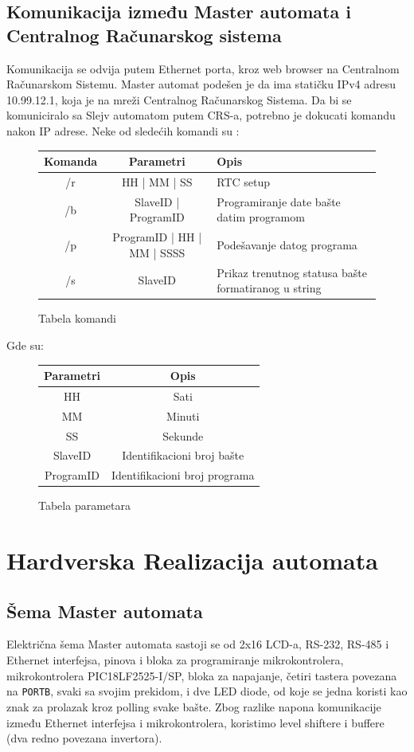 \documentclass[12pt]{article}
\numberwithin{figure}{section}
\begin{document}
  \subsection{Komunikacija između Master automata i Centralnog Računarskog sistema}
    Komunikacija se odvija putem Ethernet porta, kroz web browser na Centralnom Računarskom Sistemu. 
    Master automat podešen je da ima statičku IPv4 adresu 10.99.12.1, koja je na mreži Centralnog Računarskog Sistema.
    Da bi se komuniciralo sa Slejv automatom putem CRS-a, potrebno je dokucati komandu nakon IP adrese.
    Neke od sledećih komandi su :
    \begin{figure}[ht]
      \begin{tabular}{|c|c|p{7cm}|}
        \hline
        Komanda & Parametri & Opis \\
        \hline
        /r & HH | MM | SS & RTC setup \\
        \hline
        /b & SlaveID | ProgramID & Programiranje date bašte datim programom \\
        \hline
        /p & ProgramID | HH | MM | SSSS & Podešavanje datog programa \\
        \hline
        /s & SlaveID & Prikaz trenutnog statusa bašte formatiranog u string \\
        \hline
      \end{tabular}
      \caption{Tabela komandi}
    \end{figure}
    Gde su: 
   \begin{figure}[ht]
     \centering
      \begin{tabular}{|c|c|}
        \hline
        Parametri & Opis \\
        \hline
        HH & Sati \\ 
        MM & Minuti \\ 
        SS & Sekunde \\
        \hline
        SlaveID & Identifikacioni broj bašte \\
        ProgramID & Identifikacioni broj programa \\
        \hline
      \end{tabular}
      \caption{Tabela parametara}
    \end{figure}
\clearpage
\section{Hardverska Realizacija automata}
  \subsection{Šema Master automata}
  Električna šema Master automata sastoji se od 2x16 LCD-a, RS-232, RS-485 i Ethernet interfejsa, pinova i bloka za programiranje mikrokontrolera, mikrokontrolera PIC18LF2525-I/SP, bloka za napajanje, četiri tastera povezana na \texttt{PORTB}, svaki sa svojim prekidom, i dve LED diode, od koje se jedna koristi kao znak za prolazak kroz polling svake bašte.
  Zbog razlike napona komunikacije između Ethernet interfejsa i mikrokontrolera, koristimo level shiftere i buffere (dva redno povezana invertora).
  
\end{document}

